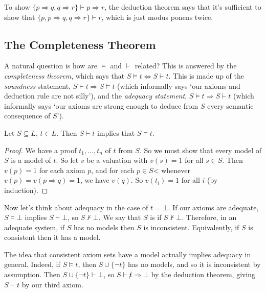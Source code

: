 \documentclass[a4paper]{scrartcl}
\begin{document}
\begin{example}
  To show $\{p \Rightarrow q, q \Rightarrow r\} \vdash p \Rightarrow r$, the deduction theorem says that it's sufficient to show that $\{p, p\Rightarrow q, q \Rightarrow r\} \vdash r$, which is just modus ponens twice.
\end{example}

\subsection{The Completeness Theorem}

A natural question is how are $\models$ and $\vdash$ related? This is answered by the \emph{completeness theorem}, which says that $S \models t \iff S \vdash t$. This is made up of the \emph{soundness} statement, $S \vdash t \Rightarrow S \models t$ (which informally says `our axioms and deduction rule are not silly'), and the \emph{adequacy statement}, $S \models t \Rightarrow S \vdash t$ (which informally says `our axioms are strong enough to deduce from $S$ every semantic consequence of $S$').

\begin{proposition}[Soundness]
  Let $S \subseteq L$, $t \in L$. Then $S \vdash t$ implies that $S \models t$.
\end{proposition}
\begin{proof}
  We have a proof $t_1, \dots, t_n$ of $t$ from $S$. So we must show that every model of $S$ is a model of $t$. So let $v$ be a valuation with $v(s) = 1$ for all $s \in S$. Then $v(p) = 1$ for each axiom $p$, and for each $p \in S$< whenever $v(p) = v(p \Rightarrow q) = 1$, we have $v(q)$. So $v(t_i) = 1$ for all $i$ (by induction).
\end{proof}

Now let's think about adequacy in the case of $t = \bot$. If our axioms are adequate, $S \models \bot$ implies $S \vdash \bot$, so $S \not \vdash \bot$. We say that $S$ is  if $S \not \vdash \bot$. Therefore, in an adequate system, if $S$ has no models then $S$ is inconsistent.
Equivalently, if $S$ is consistent then it has a model.

The idea that consistent axiom sets have a model actually implies adequacy in general. Indeed, if $S \models t$, then $S \cup \{\lnot t\}$ has no models, and so it is inconsistent by assumption. Then $S \cup \{\lnot t\} \vdash \bot$, so $S \vdash \not t \Rightarrow \bot$ by the deduction theorem, giving $S \vdash t$ by our third axiom.
\end{document}
